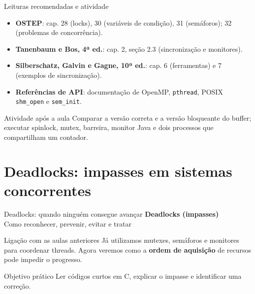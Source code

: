 \documentclass[aspectratio=169,11pt]{beamer}
\begin{document}
\begin{frame}{Leituras recomendadas e atividade}
\small
\begin{itemize}
\item \textbf{OSTEP}: cap. 28 (locks), 30 (variáveis de condição), 31 (semáforos); 32 (problemas de concorrência).
\item \textbf{Tanenbaum e Bos, 4ª ed.}: cap. 2, seção 2.3 (sincronização e monitores).
\item \textbf{Silberschatz, Galvin e Gagne, 10ª ed.}: cap. 6 (ferramentas) e 7 (exemplos de sincronização).
\item \textbf{Referências de API}: documentação de OpenMP, \texttt{pthread}, POSIX \texttt{shm\_open} e \texttt{sem\_init}.
\end{itemize}
\begin{block}{Atividade após a aula}
Comparar a versão correta e a versão bloqueante do buffer; executar spinlock, mutex, barreira, monitor Java e dois processos que compartilham um contador.
\end{block}
\end{frame}


\section{Deadlocks: impasses em sistemas concorrentes}

\begin{frame}{Deadlocks: quando ninguém consegue avançar}
\centering
{\Large\bfseries Deadlocks (impasses)}\\[.7cm]
{\large Como reconhecer, prevenir, evitar e tratar}\par
\vspace{.7cm}
\begin{block}{Ligação com as aulas anteriores}
Já utilizamos mutexes, semáforos e monitores para coordenar threads. Agora veremos como a \textbf{ordem de aquisição} de recursos pode impedir o progresso.
\end{block}
\begin{alertblock}{Objetivo prático}
Ler códigos curtos em C, explicar o impasse e identificar uma correção.
\end{alertblock}
\end{frame}
\end{document}
